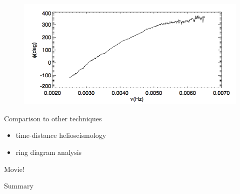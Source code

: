 \documentclass{beamer}
\begin{document}
\begin{frame}
    \begin{figure}
        \includegraphics[width=\textwidth]{fig_11.png}
    \end{figure}
\end{frame}

\begin{frame}{8.12}
\end{frame}

\begin{frame}{8.13}
\end{frame}

\begin{frame}{8.14}
\end{frame}

\begin{frame}{Comparison to other techniques}
    \begin{itemize}
        \item time-distance helioseismology
        \item ring diagram analysis
    \end{itemize}
\end{frame}

\begin{frame}{Movie!}
\end{frame}

\begin{frame}{Summary}
\end{frame}

\end{document}

